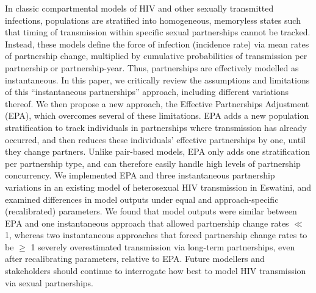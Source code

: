 In classic compartmental models of HIV and other sexually transmitted infections,
populations are stratified into homogeneous, memoryless states
such that timing of transmission within specific sexual partnerships cannot be tracked.
Instead, these models define the force of infection (incidence rate) via
mean rates of partnership change, multiplied by
cumulative probabilities of transmission per partnership or partnership-year.
Thus, partnerships are effectively modelled as instantaneous.
In this paper, we critically review
the assumptions and limitations of this ``instantaneous partnerships'' approach,
including different variations thereof.
We then propose a new approach, the Effective Partnerships Adjustment (EPA),
which overcomes several of these limitations.
EPA adds a new population stratification to track
individuals in partnerships where transmission has already occurred,
and then reduces these individuals' effective partnerships by one,
until they change partners.
Unlike pair-based models, EPA only adds one stratification per partnership type,
and can therefore easily handle high levels of partnership concurrency.
We implemented EPA and three instantaneous partnership variations
in an existing model of heterosexual HIV transmission in Eswatini,
and examined differences in model outputs
under equal and approach-specific (recalibrated) parameters.
We found that model outputs were similar between EPA and
one instantaneous approach that allowed partnership change rates $\ll$ 1, whereas
two instantaneous approaches that forced partnership change rates to be $\ge$ 1
severely overestimated transmission via long-term partnerships,
even after recalibrating parameters, relative to EPA.
Future modellers and stakeholders should continue to interrogate
how best to model HIV transmission via sexual partnerships.
